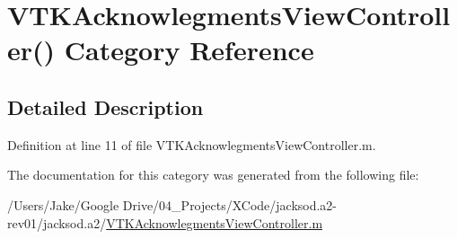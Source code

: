\hypertarget{category_v_t_k_acknowlegments_view_controller_07_08}{\section{V\+T\+K\+Acknowlegments\+View\+Controller() Category Reference}
\label{category_v_t_k_acknowlegments_view_controller_07_08}
}


\subsection{Detailed Description}


Definition at line 11 of file V\+T\+K\+Acknowlegments\+View\+Controller.\+m.



The documentation for this category was generated from the following file\+:\begin{DoxyCompactItemize}
\item 
/\+Users/\+Jake/\+Google Drive/04\+\_\+\+Projects/\+X\+Code/jacksod.\+a2-\/rev01/jacksod.\+a2/\hyperlink{_v_t_k_acknowlegments_view_controller_8m}{V\+T\+K\+Acknowlegments\+View\+Controller.\+m}\end{DoxyCompactItemize}
